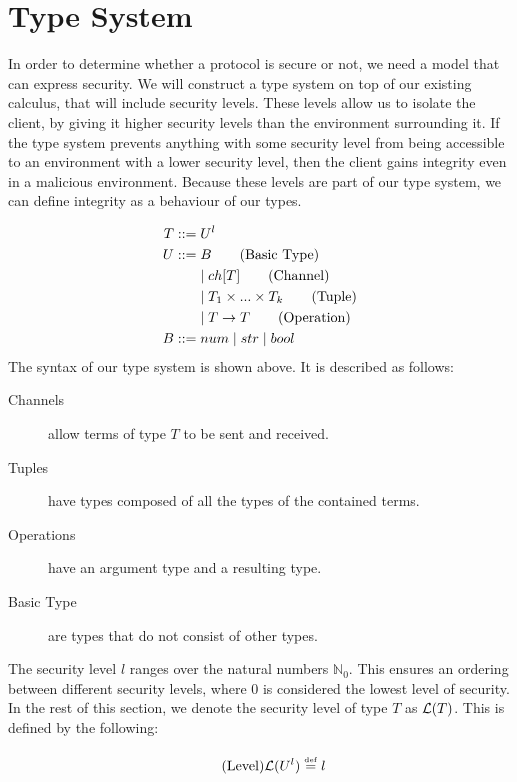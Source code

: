 \section{Type System}\label{ch:type-security}
In order to determine whether a protocol is secure or not, we need a model that can express security.
We will construct a type system on top of our existing calculus, that will include security levels.
These levels allow us to isolate the client, by giving it higher security levels than the environment surrounding it.
If the type system prevents anything with some security level from being accessible to an environment with a lower security level, then the client gains integrity even in a malicious environment.
Because these levels are part of our type system, we can define integrity as a behaviour of our types.

\begin{align*}
T::=&\;U^l\\    	
U::=&\;B \tag{Basic Type}\\
&\mid ch[T] \tag{Channel}\\
&\mid T_1 \times...\times T_k \tag{Tuple}\\
&\mid T\rightarrow T \tag{Operation}\\
B::=&\;num 
\mid str
\mid bool\\
\end{align*}
The syntax of our type system is shown above. It is described as follows:

\begin{description}
	\item[Channels] allow terms of type $T$ to be sent and received.
	\item[Tuples] have types composed of all the types of the contained terms.
	\item[Operations] have an argument type and a resulting type.
	\item[Basic Type] are types that do not consist of other types.
\end{description}

The security level $l$ ranges over the natural numbers $\mathbb{N}_0$.
This ensures an ordering between different security levels, where $0$ is considered the lowest level of security.
In the rest of this section, we denote the security level of type $T$ as $\mathcal{L}(T)$.
This is defined by the following:

\begin{align*}
\tag{Level}\mathcal{L}(U^l)\overset{\underset{\mathrm{def}}{}}{=} l
\end{align*}

